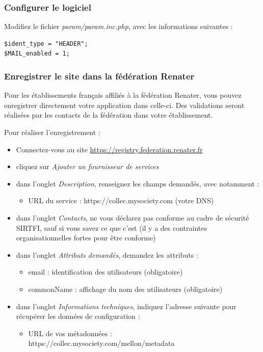 \subsubsection{Configurer le logiciel}
Modifiez le fichier \textit{param/param.inc.php}, avec les informations suivantes :

\begin{lstlisting}
$ident_type = "HEADER";
$MAIL_enabled = 1;
\end{lstlisting}

\subsubsection{Enregistrer le site dans la fédération Renater}

Pour les établissements français affiliés à la fédération Renater, vous pouvez enregistrer directement votre application dans celle-ci. Des validations seront réalisées par les contacts de la fédération dans votre établissement.

Pour réaliser l'enregistrement :
\begin{itemize}
	\item Connectez-vous au site \href{https://registry.federation.renater.fr}{https://registry.federation.renater.fr}
	\item cliquez sur \textit{Ajouter un fournisseur de services}
	\item  dans l'onglet \textit{Description}, renseignez les champs demandés, avec notamment :
	\begin{itemize}
		\item URL du service : https://collec.mysociety.com (votre DNS)
	\end{itemize}
	\item  dans l'onglet \textit{Contacts}, ne vous déclarez pas conforme au cadre de sécurité SIRTFI, sauf si vous savez ce que c'est (il y a des contraintes organisationnelles fortes pour être conforme)
	\item dans l'onglet \textit{Attributs demandés}, demandez les attributs :
	\begin{itemize}
		\item email : identification des utilisateurs (obligatoire)
		\item commonName : affichage du nom des utilisateurs (obligatoire)
	\end{itemize}
	\item dans l'onglet \textit{Informations techniques}, indiquez l'adresse suivante pour récupérer les données de configuration :
	\begin{itemize}
		\item URL de vos métadonnées : \\https://collec.mysociety.com/mellon/metadata
	\end{itemize}
\end{itemize}

